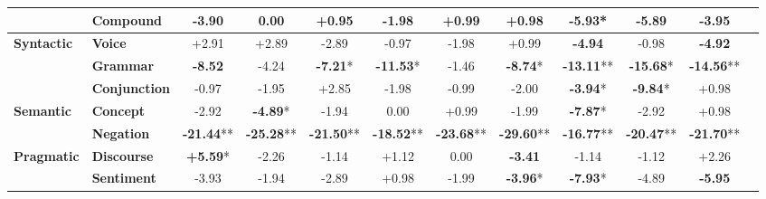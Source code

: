 \begin{table}[h]
\begin{adjustbox}{max width=\linewidth}
\begin{tabular}{llcccccccccc}
 & \textbf{Compound} & \cellcolor{red!11} -3.90 & \cellcolor{red!0} 0.00 & \cellcolor{green!2} +0.95 & \cellcolor{red!5} -1.98 & \cellcolor{green!2} +0.99 & \cellcolor{green!2} +0.98 & \cellcolor{red!17} \textbf{-5.93}* & \cellcolor{red!17} -5.89 & \cellcolor{red!11} -3.95 \\
\hline
\textbf{Syntactic} & \textbf{Voice} & \cellcolor{green!8} +2.91 & \cellcolor{green!8} +2.89 & \cellcolor{red!8} -2.89 & \cellcolor{red!2} -0.97 & \cellcolor{red!5} -1.98 & \cellcolor{green!2} +0.99 & \cellcolor{red!14} \textbf{-4.94} & \cellcolor{red!2} -0.98 & \cellcolor{red!14} \textbf{-4.92} \\
 & \textbf{Grammar} & \cellcolor{red!25} \textbf{-8.52} & \cellcolor{red!12} -4.24 & \cellcolor{red!21} \textbf{-7.21}* & \cellcolor{red!30} \textbf{-11.53}* & \cellcolor{red!4} -1.46 & \cellcolor{red!26} \textbf{-8.74}* & \cellcolor{red!30} \textbf{-13.11}** & \cellcolor{red!30} \textbf{-15.68}* & \cellcolor{red!30} \textbf{-14.56}** \\
 & \textbf{Conjunction} & \cellcolor{red!2} -0.97 & \cellcolor{red!5} -1.95 & \cellcolor{green!8} +2.85 & \cellcolor{red!5} -1.98 & \cellcolor{red!2} -0.99 & \cellcolor{red!5} -2.00 & \cellcolor{red!11} \textbf{-3.94}* & \cellcolor{red!29} \textbf{-9.84}* & \cellcolor{green!2} +0.98 \\
\hline
\textbf{Semantic} & \textbf{Concept} & \cellcolor{red!8} -2.92 & \cellcolor{red!14} \textbf{-4.89}* & \cellcolor{red!5} -1.94 & \cellcolor{red!0} 0.00 & \cellcolor{green!2} +0.99 & \cellcolor{red!5} -1.99 & \cellcolor{red!23} \textbf{-7.87}* & \cellcolor{red!8} -2.92 & \cellcolor{green!2} +0.98 \\
 & \textbf{Negation} & \cellcolor{red!30} \textbf{-21.44}** & \cellcolor{red!30} \textbf{-25.28}** & \cellcolor{red!30} \textbf{-21.50}** & \cellcolor{red!30} \textbf{-18.52}** & \cellcolor{red!30} \textbf{-23.68}** & \cellcolor{red!30} \textbf{-29.60}** & \cellcolor{red!30} \textbf{-16.77}** & \cellcolor{red!30} \textbf{-20.47}** & \cellcolor{red!30} \textbf{-21.70}** \\
\hline
\textbf{Pragmatic} & \textbf{Discourse} & \cellcolor{green!16} \textbf{+5.59}* & \cellcolor{red!6} -2.26 & \cellcolor{red!3} -1.14 & \cellcolor{green!3} +1.12 & \cellcolor{red!0} 0.00 & \cellcolor{red!10} \textbf{-3.41} & \cellcolor{red!3} -1.14 & \cellcolor{red!3} -1.12 & \cellcolor{green!6} +2.26 \\
 & \textbf{Sentiment} & \cellcolor{red!11} -3.93 & \cellcolor{red!5} -1.94 & \cellcolor{red!8} -2.89 & \cellcolor{green!2} +0.98 & \cellcolor{red!5} -1.99 & \cellcolor{red!11} \textbf{-3.96}* & \cellcolor{red!23} \textbf{-7.93}* & \cellcolor{red!14} -4.89 & \cellcolor{red!17} \textbf{-5.95} \\

\end{tabular}
\end{adjustbox}
\end{table}
